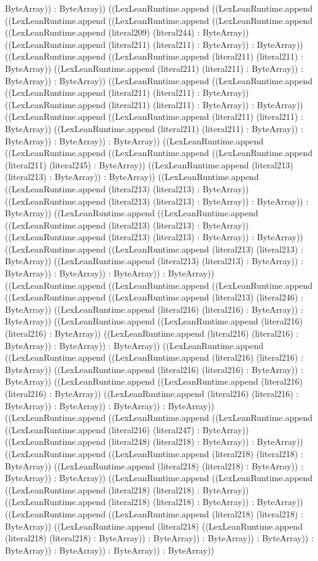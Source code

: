 \documentclass[11pt]{article}
\begin{document}
ByteArray)) : ByteArray)) ((LexLeanRuntime.append ((LexLeanRuntime.append ((LexLeanRuntime.append ((LexLeanRuntime.append ((LexLeanRuntime.append ((LexLeanRuntime.append (literal209) (literal244) : ByteArray)) ((LexLeanRuntime.append (literal211) (literal211) : ByteArray)) : ByteArray)) ((LexLeanRuntime.append ((LexLeanRuntime.append (literal211) (literal211) : ByteArray)) ((LexLeanRuntime.append (literal211) (literal211) : ByteArray)) : ByteArray)) : ByteArray)) ((LexLeanRuntime.append ((LexLeanRuntime.append ((LexLeanRuntime.append (literal211) (literal211) : ByteArray)) ((LexLeanRuntime.append (literal211) (literal211) : ByteArray)) : ByteArray)) ((LexLeanRuntime.append ((LexLeanRuntime.append (literal211) (literal211) : ByteArray)) ((LexLeanRuntime.append (literal211) (literal211) : ByteArray)) : ByteArray)) : ByteArray)) : ByteArray)) ((LexLeanRuntime.append ((LexLeanRuntime.append ((LexLeanRuntime.append ((LexLeanRuntime.append (literal211) (literal245) : ByteArray)) ((LexLeanRuntime.append (literal213) (literal213) : ByteArray)) : ByteArray)) ((LexLeanRuntime.append ((LexLeanRuntime.append (literal213) (literal213) : ByteArray)) ((LexLeanRuntime.append (literal213) (literal213) : ByteArray)) : ByteArray)) : ByteArray)) ((LexLeanRuntime.append ((LexLeanRuntime.append ((LexLeanRuntime.append (literal213) (literal213) : ByteArray)) ((LexLeanRuntime.append (literal213) (literal213) : ByteArray)) : ByteArray)) ((LexLeanRuntime.append ((LexLeanRuntime.append (literal213) (literal213) : ByteArray)) ((LexLeanRuntime.append (literal213) (literal213) : ByteArray)) : ByteArray)) : ByteArray)) : ByteArray)) : ByteArray)) ((LexLeanRuntime.append ((LexLeanRuntime.append ((LexLeanRuntime.append ((LexLeanRuntime.append ((LexLeanRuntime.append (literal213) (literal246) : ByteArray)) ((LexLeanRuntime.append (literal216) (literal216) : ByteArray)) : ByteArray)) ((LexLeanRuntime.append ((LexLeanRuntime.append (literal216) (literal216) : ByteArray)) ((LexLeanRuntime.append (literal216) (literal216) : ByteArray)) : ByteArray)) : ByteArray)) ((LexLeanRuntime.append ((LexLeanRuntime.append ((LexLeanRuntime.append (literal216) (literal216) : ByteArray)) ((LexLeanRuntime.append (literal216) (literal216) : ByteArray)) : ByteArray)) ((LexLeanRuntime.append ((LexLeanRuntime.append (literal216) (literal216) : ByteArray)) ((LexLeanRuntime.append (literal216) (literal216) : ByteArray)) : ByteArray)) : ByteArray)) : ByteArray)) ((LexLeanRuntime.append ((LexLeanRuntime.append ((LexLeanRuntime.append ((LexLeanRuntime.append (literal216) (literal247) : ByteArray)) ((LexLeanRuntime.append (literal248) (literal218) : ByteArray)) : ByteArray)) ((LexLeanRuntime.append ((LexLeanRuntime.append (literal218) (literal218) : ByteArray)) ((LexLeanRuntime.append (literal218) (literal218) : ByteArray)) : ByteArray)) : ByteArray)) ((LexLeanRuntime.append ((LexLeanRuntime.append ((LexLeanRuntime.append (literal218) (literal218) : ByteArray)) ((LexLeanRuntime.append (literal218) (literal218) : ByteArray)) : ByteArray)) ((LexLeanRuntime.append ((LexLeanRuntime.append (literal218) (literal218) : ByteArray)) ((LexLeanRuntime.append (literal218) ((LexLeanRuntime.append (literal218) (literal218) : ByteArray)) : ByteArray)) : ByteArray)) : ByteArray)) : ByteArray)) : ByteArray)) : ByteArray)) : ByteArray)) 
\end{document}
